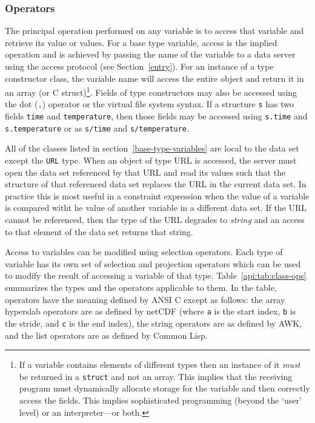 \subsubsection{Operators}
\label{api:operators}

The principal operation performed on any variable is to access that variable
and retrieve its value or values.  For a base type variable, access is the
implied operation and is achieved by passing the name of the variable to a
data server using the access protocol (see Section~\ref{entry}). For an
instance of a type constructor class, the variable name will access the
entire object and return it in an array (or C struct)\footnote{If a variable
  contains elements of different types then an instance of it {\em must\/} be
  returned in a {\tt struct} and not an array.  This implies that the
  receiving program must dynamically allocate storage for the variable and
  then correctly access the fields.  This implies sophisticated programming
  (beyond the `user' level) or an interpreter---or both.}. Fields of type
constructors may also be accessed using the dot ({\tt.}) operator or the
virtual file system syntax. If a structure {\tt s} has two fields {\tt time}
and {\tt temperature}, then those fields may be accessed using {\tt s.time}
and {\tt s.temperature} or as {\tt s/time} and {\tt s/temperature}.

All of the classes listed in section~\ref{base-type-variables} are local to
the data set except the {\tt URL} type. When an object of type URL is
accessed, the server must open the data set referenced by that URL and read
its values such that the structure of that referenced data set replaces the
URL in the current data set. In practice this is most useful in a constraint
expression when the value of a variable is compared witht he value of another
variable in a different data set. If the URL cannot be referenced, then the
type of the URL degrades to {\em string\/} and an access to that element of
the data set returns that string.

Access to variables can be modified using selection operators. Each type of
variable has its own set of selection and projection operators which can be
used to modify the result of accessing a variable of that type.
Table~\ref{api:tab:class-ops} summarizes the types and the operators applicable
to them. In the table, operators have the meaning defined by ANSI C except as
follows: the array hyperslab operators are as defined by netCDF\cite{netcdf}
(where {\tt a} is the start index, {\tt b} is the stride, and {\tt c} is the
end index), the string operators are as defined by AWK\cite{kern:upe}, and
the list operators are as defined by Common Lisp\cite{steele:clisp}.

